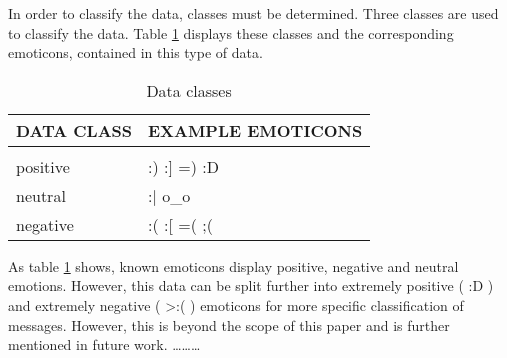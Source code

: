 \noindent In order to classify the data, classes must be determined. Three classes are used to classify the data. Table \ref{tab:classes} displays these classes and the corresponding emoticons, contained in this type of data.


\begin{comment}
\begin{itemize}
\item \textbf{positive} - data containing `positive' emoticons (expressing positive emotions) such as `:)', `:]', `=)', or `:D'
\item \textbf{neutral} - data containing no emoticons or neutral emoticons like `:$\vert$' or `o\_o'
\item \textbf{negative} - data containing `negative' emoticons (expressing negative emotions) such as `:(', `:[', `=(` or `;(' 
\end{itemize}
\end{comment}


\begin{table}[h!]
\caption{Data classes}
\label{tab:classes}
\begin{center}
\begin{tabular}{ll}
\multicolumn{1}{l}{\bf DATA CLASS}  &\multicolumn{1}{l}{\bf EXAMPLE EMOTICONS}
\\ \hline \\
positive 			& :) \: \:  			:] \: \: 		=) \: \: 		:D  	\\
neutral 				& :$\vert$ \: \: 	o\_o  								\\
negative 			& :( \: \: 			:[ \: \: 		=( \: \: 		;( 		\\
\end{tabular}{}
\end{center}
\end{table}
As table \ref{tab:classes} shows, known emoticons display positive, negative and neutral emotions. However, this data can be split further into extremely positive ( :D ) and extremely negative ( >:( ) emoticons for more specific classification of messages. However, this is beyond the scope of this paper and is further mentioned in future work.
\ldots \ldots \ldots 

 \\


